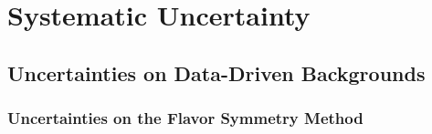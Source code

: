 
\chapter{Systematic Uncertainty} %

\label{ch:backgrounds} 

\section{Uncertainties on Data-Driven Backgrounds}

\subsection{Uncertainties on the Flavor Symmetry Method}
\label{sec:unc_fs}

